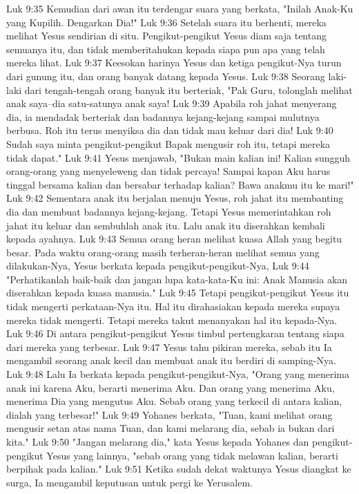 Luk 9:35  Kemudian dari awan itu terdengar suara yang berkata, "Inilah Anak-Ku yang Kupilih. Dengarkan Dia!"
Luk 9:36  Setelah suara itu berhenti, mereka melihat Yesus sendirian di situ. Pengikut-pengikut Yesus diam saja tentang semuanya itu, dan tidak memberitahukan kepada siapa pun apa yang telah mereka lihat.
Luk 9:37  Keesokan harinya Yesus dan ketiga pengikut-Nya turun dari gunung itu, dan orang banyak datang kepada Yesus.
Luk 9:38  Seorang laki-laki dari tengah-tengah orang banyak itu berteriak, "Pak Guru, tolonglah melihat anak saya--dia satu-satunya anak saya!
Luk 9:39  Apabila roh jahat menyerang dia, ia mendadak berteriak dan badannya kejang-kejang sampai mulutnya berbusa. Roh itu terus menyiksa dia dan tidak mau keluar dari dia!
Luk 9:40  Sudah saya minta pengikut-pengikut Bapak mengusir roh itu, tetapi mereka tidak dapat."
Luk 9:41  Yesus menjawab, "Bukan main kalian ini! Kalian sungguh orang-orang yang menyeleweng dan tidak percaya! Sampai kapan Aku harus tinggal bersama kalian dan bersabar terhadap kalian? Bawa anakmu itu ke mari!"
Luk 9:42  Sementara anak itu berjalan menuju Yesus, roh jahat itu membanting dia dan membuat badannya kejang-kejang. Tetapi Yesus memerintahkan roh jahat itu keluar dan sembuhlah anak itu. Lalu anak itu diserahkan kembali kepada ayahnya.
Luk 9:43  Semua orang heran melihat kuasa Allah yang begitu besar. Pada waktu orang-orang masih terheran-heran melihat semua yang dilakukan-Nya, Yesus berkata kepada pengikut-pengikut-Nya,
Luk 9:44  "Perhatikanlah baik-baik dan jangan lupa kata-kata-Ku ini: Anak Manusia akan diserahkan kepada kuasa manusia."
Luk 9:45  Tetapi pengikut-pengikut Yesus itu tidak mengerti perkataan-Nya itu. Hal itu dirahasiakan kepada mereka supaya mereka tidak mengerti. Tetapi mereka takut menanyakan hal itu kepada-Nya.
Luk 9:46  Di antara pengikut-pengikut Yesus timbul pertengkaran tentang siapa dari mereka yang terbesar.
Luk 9:47  Yesus tahu pikiran mereka, sebab itu Ia mengambil seorang anak kecil dan membuat anak itu berdiri di samping-Nya.
Luk 9:48  Lalu Ia berkata kepada pengikut-pengikut-Nya, "Orang yang menerima anak ini karena Aku, berarti menerima Aku. Dan orang yang menerima Aku, menerima Dia yang mengutus Aku. Sebab orang yang terkecil di antara kalian, dialah yang terbesar!"
Luk 9:49  Yohanes berkata, "Tuan, kami melihat orang mengusir setan atas nama Tuan, dan kami melarang dia, sebab ia bukan dari kita."
Luk 9:50  "Jangan melarang dia," kata Yesus kepada Yohanes dan pengikut-pengikut Yesus yang lainnya, "sebab orang yang tidak melawan kalian, berarti berpihak pada kalian."
Luk 9:51  Ketika sudah dekat waktunya Yesus diangkat ke surga, Ia mengambil keputusan untuk pergi ke Yerusalem.
